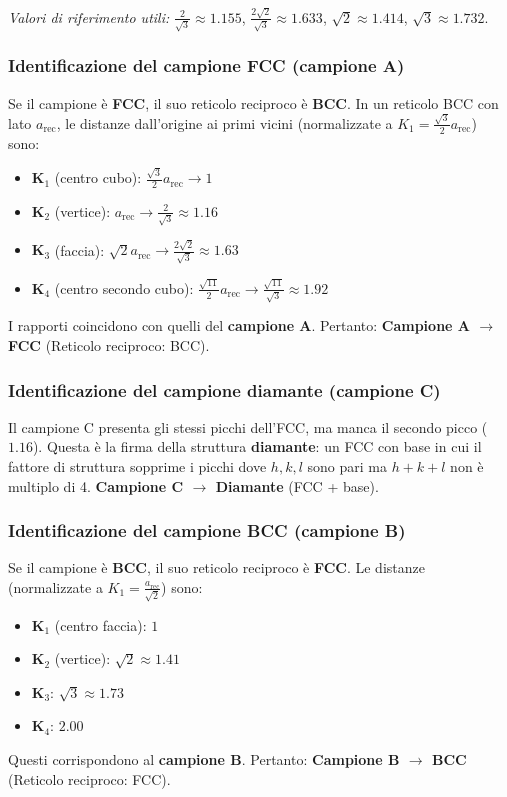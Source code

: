 \textit{Valori di riferimento utili:}
$\frac{2}{\sqrt{3}} \approx 1.155$, $\frac{2\sqrt{2}}{\sqrt{3}} \approx 1.633$, $\sqrt{2} \approx 1.414$, $\sqrt{3} \approx 1.732$.

\subsubsection{Identificazione del campione FCC (campione A)}

Se il campione è \textbf{FCC}, il suo reticolo reciproco è \textbf{BCC}. In un reticolo BCC con lato $a_{\text{rec}}$, le distanze dall'origine ai primi vicini (normalizzate a $K_1 = \frac{\sqrt{3}}{2} a_{\text{rec}}$) sono:

\begin{itemize}
    \item $\mathbf{K}_1$ (centro cubo): $\frac{\sqrt{3}}{2} a_{\text{rec}} \rightarrow 1$
    \item $\mathbf{K}_2$ (vertice): $a_{\text{rec}} \rightarrow \frac{2}{\sqrt{3}} \approx 1.16$
    \item $\mathbf{K}_3$ (faccia): $\sqrt{2} a_{\text{rec}} \rightarrow \frac{2\sqrt{2}}{\sqrt{3}} \approx 1.63$
    \item $\mathbf{K}_4$ (centro secondo cubo): $\frac{\sqrt{11}}{2} a_{\text{rec}} \rightarrow \frac{\sqrt{11}}{\sqrt{3}} \approx 1.92$
\end{itemize}

I rapporti coincidono con quelli del \textbf{campione A}. Pertanto:
\textbf{Campione A $\rightarrow$ FCC} (Reticolo reciproco: BCC).

\subsubsection{Identificazione del campione diamante (campione C)}

Il campione C presenta gli stessi picchi dell'FCC, ma manca il secondo picco ($1.16$). Questa è la firma della struttura \textbf{diamante}: un FCC con base in cui il fattore di struttura sopprime i picchi dove $h,k,l$ sono pari ma $h+k+l$ non è multiplo di 4.
\textbf{Campione C $\rightarrow$ Diamante} (FCC + base).

\subsubsection{Identificazione del campione BCC (campione B)}

Se il campione è \textbf{BCC}, il suo reticolo reciproco è \textbf{FCC}. Le distanze (normalizzate a $K_1 = \frac{a_{\text{rec}}}{\sqrt{2}}$) sono:
\begin{itemize}
    \item $\mathbf{K}_1$ (centro faccia): $1$
    \item $\mathbf{K}_2$ (vertice): $\sqrt{2} \approx 1.41$
    \item $\mathbf{K}_3$: $\sqrt{3} \approx 1.73$
    \item $\mathbf{K}_4$: $2.00$
\end{itemize}
Questi corrispondono al \textbf{campione B}. Pertanto:
\textbf{Campione B $\rightarrow$ BCC} (Reticolo reciproco: FCC).

